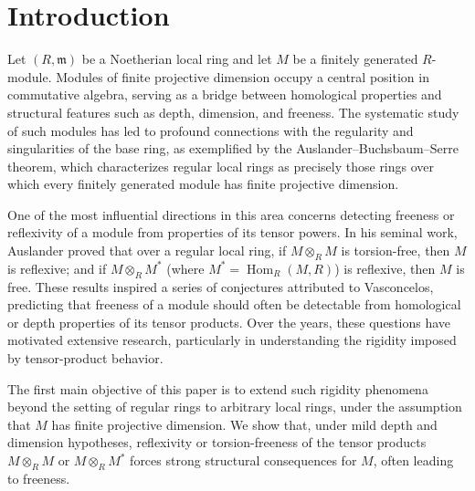 \documentclass[11.05pt,a4paper]{amsart}
\theoremstyle{definition}
\theoremstyle{remark}
\begin{document}
\section{Introduction}

Let \( (R, \mathfrak{m}) \) be a Noetherian local ring and let \( M \) be a finitely generated \( R \)-module. Modules of finite projective dimension occupy a central position in commutative algebra, serving as a bridge between homological properties and structural features such as depth, dimension, and freeness. The systematic study of such modules has led to profound connections with the regularity and singularities of the base ring, as exemplified by the Auslander--Buchsbaum--Serre theorem, which characterizes regular local rings as precisely those rings over which every finitely generated module has finite projective dimension.

One of the most influential directions in this area concerns detecting freeness or reflexivity of a module from properties of its tensor powers. In his seminal work, Auslander proved that over a regular local ring, if \( M \otimes_R M \) is torsion-free, then \( M \) is reflexive; and if \( M \otimes_R M^* \) (where \( M^* = \operatorname{Hom}_R(M, R) \)) is reflexive, then \( M \) is free. These results inspired a series of conjectures attributed to Vasconcelos, predicting that freeness of a module should often be detectable from homological or depth properties of its tensor products. Over the years, these questions have motivated extensive research, particularly in understanding the rigidity imposed by tensor-product behavior.

The first main objective of this paper is to extend such rigidity phenomena beyond the setting of regular rings to arbitrary local rings, under the assumption that \( M \) has finite projective dimension. We show that, under mild depth and dimension hypotheses, reflexivity or torsion-freeness of the tensor products \( M \otimes_R M \) or \( M \otimes_R M^* \) forces strong structural consequences for \( M \), often leading to freeness.
\end{document}

